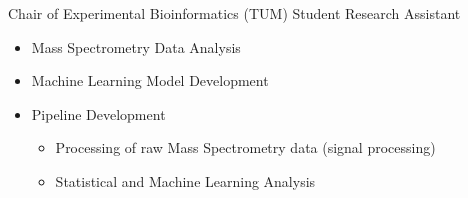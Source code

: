 {%
	Chair of Experimental Bioinformatics (TUM)
}
{%
	Student Research Assistant
}
{%
	\vspace*{.07cm}
	\begin{itemize}
		\item Mass Spectrometry Data Analysis
		\item Machine Learning Model Development
		\item Pipeline Development
		\begin{itemize}
			\item Processing of raw Mass Spectrometry data (signal processing)
			\item Statistical and Machine Learning Analysis
		\end{itemize}
	\end{itemize}
}

